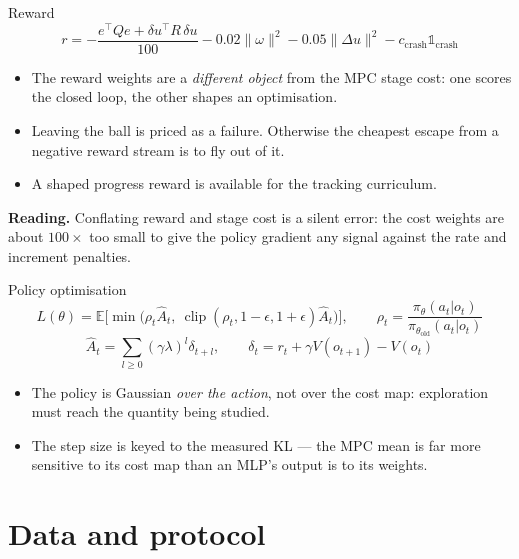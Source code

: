 \documentclass[10pt]{beamer}
\newcommand{\takeaway}[1]{\par\vfill{\footnotesize\textbf{Reading.} #1\par}}
\begin{document}
\begin{frame}{Reward}
  \[
    r=-\frac{e^{\!\top}Qe+\delta u^{\!\top}R\,\delta u}{100}
      -0.02\|\omega\|^{2}-0.05\|\Delta u\|^{2}
      -c_{\mathrm{crash}}\mathbb{1}_{\mathrm{crash}}
  \]
  \begin{itemize}
    \item The reward weights are a \emph{different object} from the MPC stage
      cost: one scores the closed loop, the other shapes an optimisation.
    \item Leaving the ball is priced as a failure. Otherwise the cheapest
      escape from a negative reward stream is to fly out of it.
    \item A shaped progress reward is available for the tracking curriculum.
  \end{itemize}
  \takeaway{Conflating reward and stage cost is a silent error: the cost
    weights are about $100\times$ too small to give the policy gradient any
    signal against the rate and increment penalties.}
\end{frame}

\begin{frame}{Policy optimisation}
  \[
    L(\theta)=\mathbb{E}\Big[\min\big(\rho_t\hat A_t,\
      \operatorname{clip}(\rho_t,1{-}\epsilon,1{+}\epsilon)\hat A_t\big)\Big],
    \qquad \rho_t=\frac{\pi_\theta(a_t|o_t)}{\pi_{\theta_{\mathrm{old}}}(a_t|o_t)}
  \]
  \[
    \hat A_t=\sum_{l\ge0}(\gamma\lambda)^{l}\delta_{t+l},
    \qquad \delta_t=r_t+\gamma V(o_{t+1})-V(o_t)
  \]
  \begin{itemize}
    \item The policy is Gaussian \emph{over the action}, not over the cost
      map: exploration must reach the quantity being studied.
    \item The step size is keyed to the measured KL --- the MPC mean is far
      more sensitive to its cost map than an MLP's output is to its weights.
  \end{itemize}
\end{frame}

\section{Data and protocol}
\end{document}
